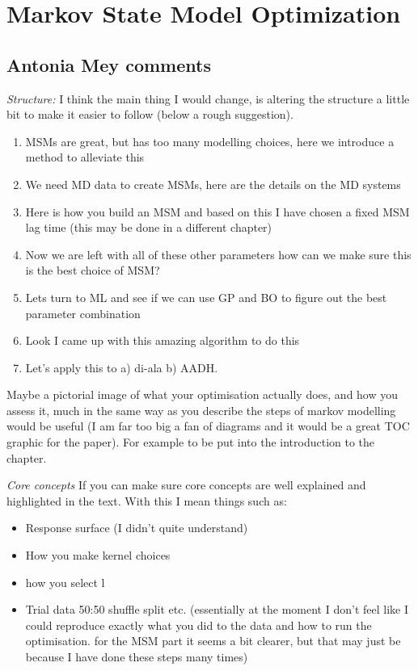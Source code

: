 \let\textcircled=\pgftextcircled
\chapter{Markov State Model Optimization}
\label{chap:msm}


\section{Antonia Mey comments}
\emph{Structure:}
I think the main thing I would change,  is altering the structure a little bit to make it easier to follow (below a rough suggestion). 

\begin{enumerate}
    \item MSMs are great, but has too many modelling choices, here we introduce a method to alleviate this
    \item We need MD data to create MSMs, here are the details on the MD systems
    \item Here is how you build an MSM and based on this I have chosen a fixed MSM lag time (this may be done in a different chapter)
    \item Now we are left with all of these other parameters how can we make sure this is the best choice of MSM?
    \item Lets turn to ML and see if we can use GP and BO to figure out the best parameter combination
    \item Look I came up with this amazing algorithm to do this
    \item Let’s apply this to a) di-ala b) AADH.
\end{enumerate}

Maybe  a pictorial image of what your optimisation actually does, and how you assess it, much in the same way as you describe the steps of markov modelling would be useful (I am far too big a fan of diagrams and it would be a great TOC graphic for the paper). For example to be put into the introduction to the chapter.

\emph{Core concepts}
If you can make sure core concepts are well explained and highlighted in the text. With this I mean things such as:
\begin{itemize}
    \item Response surface (I didn’t quite understand)
    \item How you make kernel choices
    \item how you select l
    \item Trial data 50:50 shuffle split etc. (essentially at the moment I don’t feel like I could reproduce exactly what you did to the data and how to run the optimisation. for the MSM part it seems a bit clearer, but that may just be because I have done these steps many times)
\end{itemize}

